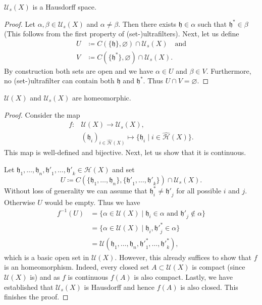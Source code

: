 \begin{lemma}
  \(\mathcal{U}_s(X)\) is a Hausdorff space.
\end{lemma}

\begin{proof}
  Let \(\alpha, \beta \in \mathcal{U}_s(X)\) and \(\alpha \neq \beta\). Then there exists \(\mathfrak{h} \in \alpha\) such that \(\mathfrak{h}^\ast \in \beta\) (This follows from the first property of (set-)ultrafilters). Next, let us define
  \begin{align*}
    U & \coloneqq C(\{\mathfrak{h}\}, \varnothing) \cap \mathcal{U}_s(X)\quad \text{and}\\
    V & \coloneqq C(\{\mathfrak{h}^\ast\},\varnothing) \cap \mathcal{U}_s(X).
  \end{align*}
  By construction both sets are open and we have \(\alpha \in U\) and \(\beta \in V\). Furthermore, no (set-)ultrafilter can contain both \(\mathfrak{h}\) and \(\mathfrak{h}^\ast\). Thus \(U \cap V = \varnothing\). 
\end{proof}

\begin{thm}
  \(\mathcal{U}(X)\) and \(\mathcal{U}_s(X)\) are homeomorphic.
\end{thm}

\begin{proof}
  Consider the map
  \begin{align*}
    f\colon &\mathcal{U}(X) \to \mathcal{U}_s(X),\\
    &(\mathfrak{h}_i)_{i \in \mathcal{\hat H}(X)} \mapsto \{\mathfrak{h}_i \mid i \in \mathcal{\hat H}(X)\}.
  \end{align*}
  This map is well-defined and bijective. Next, let us show that it is continuous.

  Let \(\mathfrak{h}_1, \dots, \mathfrak{h}_n, \mathfrak{h'}_1, \dots,\mathfrak{h'}_k \in \mathcal{H}(X)\) and set
  \[
    U \coloneqq C(\{\mathfrak{h}_1, \dots, \mathfrak{h}_n\}, \{\mathfrak{h'}_1, \dots, \mathfrak{h'}_k\}) \cap \mathcal{U}_s(X).
  \]
  Without loss of generality we can assume that \(\mathfrak{h}^\ast_i \neq \mathfrak{h'}_j\) for all possible \(i\) and \(j\). Otherwise \(U\) would be empty. Thus we have
  \begin{align*}
    f^{-1}(U)
    & = \{\alpha \in \mathcal{U}(X) \mid \mathfrak{h}_i \in \alpha \text{ and } \mathfrak{h'}_j \notin \alpha\}\\
    & = \{\alpha \in \mathcal{U}(X) \mid \mathfrak{h}_i, \mathfrak{h'}^\ast_j \in \alpha\}\\
    & = \mathcal{U}(\mathfrak{h}_1, \dots, \mathfrak{h}_n, \mathfrak{h'}^\ast_1, \dots, \mathfrak{h'}^\ast_k),
  \end{align*}
  which is a basic open set in \(\mathcal{U}(X)\). However, this already suffices to show that \(f\) is an homeomorphism. Indeed, every closed set \(A \subset \mathcal{U}(X)\) is compact (since \(\mathcal{U}(X)\) is) and as \(f\) is continuous \(f(A)\) is also compact. Lastly, we have established that \(\mathcal{U}_s(X)\) is Hausdorff and hence \(f(A)\) is also closed. This finishes the proof.
\end{proof}


